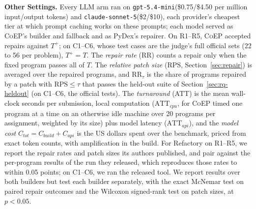 \documentclass[acmsmall,screen,review,anonymous,nonacm]{acmart}
\newcommand{\tool}{\textsc{CoEP}\xspace}
\newcommand{\V}[1]{\ensuremath{\mathit{#1}}}
\newcommand{\RPS}{\mathrm{RPS}}
\newcommand{\cs}{\texttt{claude-sonnet-5}\xspace}
\newcommand{\gm}{\texttt{gpt-5.4-mini}\xspace}
\begin{document}
\textbf{Other Settings.} Every LLM arm ran on \gm (\$0.75/\$4.50 per million input/output tokens) and \cs (\$2/\$10), each provider's cheapest tier at which prompt caching works on these prompts; each model served as \tool's builder and fallback and as PyDex's repairer. On R1--R5, \tool accepted repairs against $T^{+}$; on C1--C6, whose test cases are the judge's full official sets (22 to 56 per problem), $T^{+} = T$. The \emph{repair rate} (RR) counts a repair only when the fixed program passes all of $T$. The \emph{relative patch size} (RPS, Section~\ref{sec:repair}) is averaged over the repaired programs, and $\mathrm{RR}_{\tau}$ is the share of programs repaired by a patch with $\RPS \le \tau$ that passes the held-out suite of Section~\ref{sec:rq-heldout} (on C1--C6, the official tests). The \emph{turnaround} (ATT) is the mean wall-clock seconds per submission, local computation ($\mathrm{ATT}_{\V{cpu}}$, for \tool timed one program at a time on an otherwise idle machine over 20 programs per assignment, weighted by its size) plus model latency ($\mathrm{ATT}_{\V{api}}$), and the \emph{model cost} $C_{\V{tot}} = C_{\V{build}} + C_{\V{api}}$ is the US dollars spent over the benchmark, priced from exact token counts, with amplification in the build. For Refactory on R1--R5, we report the repair rates and patch sizes its authors published, and pair against the per-program results of the run they released, which reproduces those rates to within 0.05 points; on C1--C6, we ran the released tool. We report results over both builders but test each builder separately, with the exact McNemar test on paired repair outcomes and the Wilcoxon signed-rank test on patch sizes, at $p < 0.05$.
\end{document}
